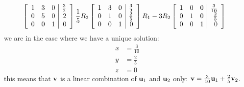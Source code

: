 \begin{solution}
\begin{align*}
& \left[ \begin{array}{rrr|r} 1 & 3 & 0 & \frac{3}{2} \\ 0 & 5 & 0 & 2\\  0 & 0 & 1 & 0 \end{array}\right]  \frac{1}{5} R_2
\left[ \begin{array}{rrr|r} 1 & 3 & 0 & \frac{3}{2} \\ 0 & 1 & 0 & \frac{2}{5}\\  0 & 0 & 1 & 0 \end{array}\right] R_1-3R_2
\left[ \begin{array}{rrr|r} 1 & 0 & 0 & \frac{3}{10} \\ 0 & 1 & 0 & \frac{2}{5}\\  0 & 0 & 1 & 0 \end{array}\right]
\end{align*}
we are in the case where we have a unique solution:
\begin{align*}
x&=\frac{3}{10}\\
y&=\frac{2}{5}\\
z&=0
\end{align*}
this means that ${\bf v}$ is a linear combination of ${\bf u}_1$ and ${\bf u}_2$ only: ${\bf v}=\frac{3}{10}{\bf u}_1+\frac{2}{5}{\bf v}_2$.
\end{solution}

